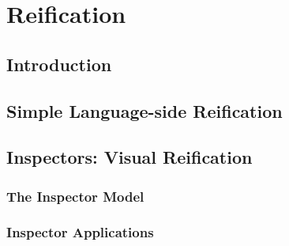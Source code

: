 
\chapter{Reification}
\minitoc

\section{Introduction}





\section{Simple Language-side Reification}




\section{Inspectors: Visual Reification}


\subsection{The Inspector Model}


\subsection{Inspector Applications}



